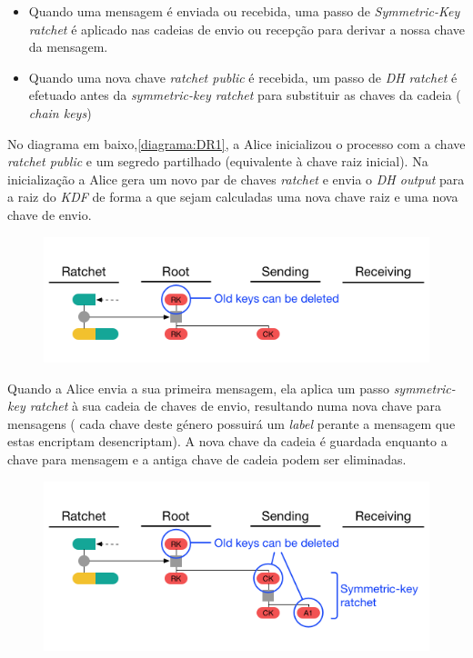 \begin{itemize}
    \item Quando uma mensagem é enviada ou recebida, uma passo de \textit{Symmetric-Key ratchet} é aplicado nas cadeias de envio ou recepção para derivar a nossa chave da mensagem.
    \item Quando uma nova chave \textit{ratchet public} é recebida, um passo de \textit{DH ratchet} é efetuado antes da \textit{symmetric-key ratchet} para substituir as chaves da cadeia ( \textit{chain keys})
\end{itemize}

No diagrama em baixo,\ref{diagrama:DR1}, a Alice inicializou o processo com a chave \textit{ratchet public} e um segredo partilhado (equivalente à chave raiz inicial). Na inicialização a Alice gera um novo par de chaves \textit{ratchet} e envia o \textit{DH output} para a raiz do \textit{KDF} de forma a que sejam calculadas uma nova chave raiz e uma nova chave de envio.

\begin{figure}[H]
\begin{center}
\includegraphics[width=12cm]{img/DR1.png}
\caption{}
\label{diagram:DR1}
\centering
\end{center}
\end{figure}

Quando a Alice envia a sua primeira mensagem, ela aplica um passo \textit{symmetric-key ratchet} à sua cadeia de chaves de envio, resultando numa nova chave para mensagens ( cada chave deste género possuirá um \textit{label} perante a mensagem que estas encriptam desencriptam). A nova chave da cadeia é guardada enquanto a chave para mensagem e a antiga chave de cadeia podem ser eliminadas.

\begin{figure}[H]
\begin{center}
\includegraphics[width=12cm]{img/DR2.png}
\caption{}
\label{diagram:DR2} 
\centering
\end{center}
\end{figure}

